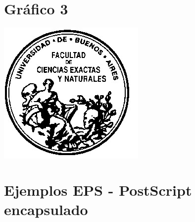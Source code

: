 \documentclass[12pt,a4paper]{article}
\begin{document}
\section{Gráfico 3}
\includegraphics[scale=1]{logo_FCEN}
\pagebreak
\section{Ejemplos EPS - PostScript encapsulado}
\end{document}
